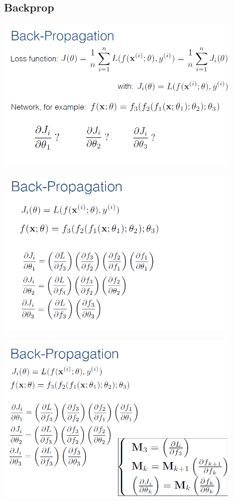 \documentclass{beamer}
\begin{document}
\subsection{Backprop}
\begin{frame}
\includegraphics[width=0.9\textwidth]{images/backprop_1.PNG} 
\end{frame}
\begin{frame}
\includegraphics[width=0.9\textwidth]{images/backprop_2.PNG} 
\end{frame}
\begin{frame}
\includegraphics[width=0.9\textwidth]{images/backprop_3.PNG} 
\end{frame}
\end{document}
